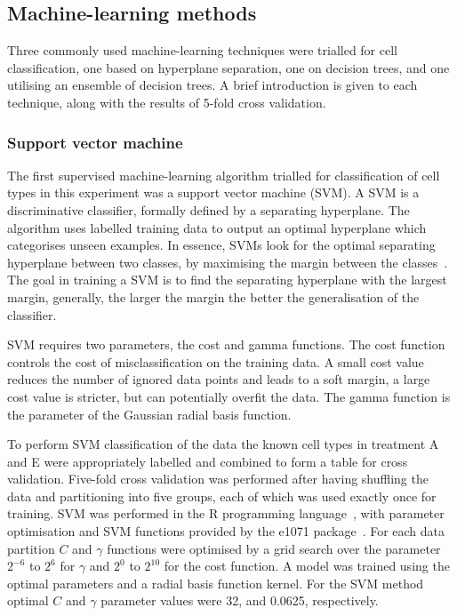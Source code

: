 \subsection{Machine-learning methods}
Three commonly used machine-learning techniques were trialled for cell classification, one based on hyperplane separation, one on decision trees, and one utilising an ensemble of decision trees. A brief introduction is given to each technique, along with the results of 5-fold cross validation.

\subsubsection{Support vector machine}
The first supervised machine-learning algorithm trialled for classification of cell types in this experiment was a support vector machine (SVM). A SVM is a discriminative classifier, formally defined by a separating hyperplane. The algorithm uses labelled training data to output an optimal hyperplane which categorises unseen examples. In essence, SVMs look for the optimal separating hyperplane between two classes, by maximising the margin between the classes~\cite{Cortes1995}. The goal in training a SVM is to find the separating hyperplane with the largest margin, generally, the larger the margin the better the generalisation of the classifier.

SVM requires two parameters, the cost and gamma functions. The cost function controls the cost of misclassification on the training data. A small cost value reduces the number of ignored data points and leads to a soft margin, a large cost value is stricter, but can potentially overfit the data. The gamma function is the parameter of the Gaussian radial basis function.

To perform SVM classification of the data the known cell types in treatment A and E were appropriately labelled and combined to form a table for cross validation. Five-fold cross validation was performed after having shuffling the data and partitioning into five groups, each of which was used exactly once for training. SVM was performed in the R programming language~\cite{RCoreTeam2014}, with parameter optimisation and SVM functions provided by the e1071 package~\cite{Hornik2015}. For each data partition $C$ and $\gamma$ functions were optimised by a grid search over the parameter $2^{-6}$ to $2^{6}$ for $\gamma$ and $2^{0}$ to $2^{10}$ for the cost function. A model was trained using the optimal parameters and a radial basis function kernel. For the SVM method optimal $C$ and $\gamma$ parameter values were 32, and 0.0625, respectively.

